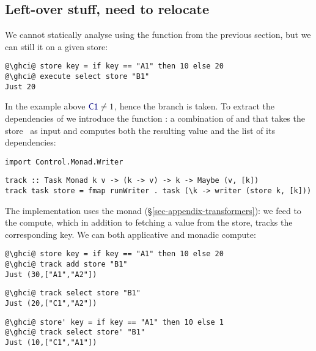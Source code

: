 \subsection{Left-over stuff, need to relocate}

We cannot statically analyse  using the function 
from the previous section, but we can still  it on a given store:

\vspace{1mm}
\begin{verbatim}
@\ghci@ store key = if key == "A1" then 10 else 20
@\ghci@ execute select store "B1"
Just 20
\end{verbatim}
\vspace{1mm}

\noindent
In the example above $\cmd{C1} \neq 1$, hence the  branch is taken.
To extract the dependencies of  we introduce the function :
a combination of  and  that takes the store~\store
as input and computes both the resulting value and the list of its dependencies:

\vspace{1mm}
\begin{verbatim}
import Control.Monad.Writer
\end{verbatim}
\vspace{0.5mm}
\begin{verbatim}
track :: Task Monad k v -> (k -> v) -> k -> Maybe (v, [k])
track task store = fmap runWriter . task (\k -> writer (store k, [k]))
\end{verbatim}
\vspace{1mm}

\noindent
The implementation uses the  monad (\S\ref{sec-appendix-transformers}):
we feed  to the compute, which in addition
to fetching a value from the store, tracks the corresponding key. We can
 both applicative and monadic compute:

\vspace{1mm}
\begin{verbatim}
@\ghci@ store key = if key == "A1" then 10 else 20
@\ghci@ track add store "B1"
Just (30,["A1","A2"])
\end{verbatim}
\vspace{1mm}
\begin{verbatim}
@\ghci@ track select store "B1"
Just (20,["C1","A2"])
\end{verbatim}
\vspace{1mm}
\begin{verbatim}
@\ghci@ store' key = if key == "A1" then 10 else 1
@\ghci@ track select store' "B1"
Just (10,["C1","A1"])
\end{verbatim}
\vspace{1mm}

